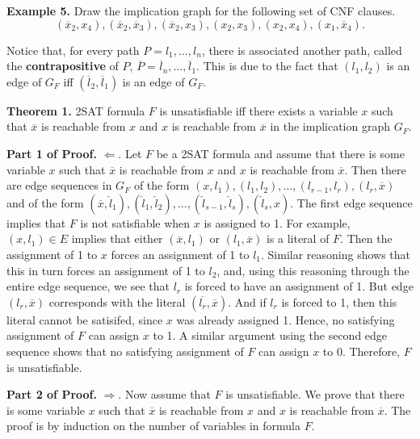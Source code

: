 \documentclass [12pt]{article}
\theoremstyle{definition}
\begin{document}
\newpage
\noindent
{\bf Example 5.} Draw the implication graph for the following set of CNF clauses.
\[
(\overline{x}_{2},x_{4}),
(\overline{x}_{2},\overline{x}_{3}),
(\overline{x}_{2},x_{3}),
(x_{2},x_{3}),
(x_{2},x_{4}),
(x_{1},\overline{x}_{4}).\]



\newpage
Notice that, for every path $P=l_{1},\ldots,l_{n}$, there is associated another path, called the \textbf{contrapositive} of $P$,  $\overline{P}=\overline{l}_{n},\ldots,\overline{l}_{1}$.
This is due to the fact that $(l_{1},l_{2})$ is an edge of $G_{F}$ iff $(\overline{l}_{2},\overline{l}_{1})$ is an edge of $G_{F}$.

\noindent
{\bf Theorem 1.} 2SAT formula $F$ is unsatisfiable iff there exists a variable $x$ such that 
 $\overline{x}$ is reachable from $x$ and $x$ is reachable from $\overline{x}$ in the implication graph
$G_{F}$.

\vspace{.25in}
\noindent
{\bf Part 1 of Proof.} $\Leftarrow$. Let $F$ be a 2SAT formula and 
assume that there is some variable $x$ such that 
 $\overline{x}$ is reachable from $x$ and $x$ is reachable from $\overline{x}$. Then there are 
edge sequences  in 
$G_{F}$ of the form $(x,l_{1}),(l_{1},l_{2}),\ldots,(l_{r-1},l_{r}),(l_{r},\overline{x})$
and of the form 
$(\overline{x},\hat{l}_{1}),(\hat{l}_{1},\hat{l}_{2}),\ldots,(\hat{l}_{s-1},\hat{l}_{s}),(\hat{l}_{s},x)$.
The first edge sequence implies that $F$ is not satisfiable when $x$ is assigned to 1. 
For example, $(x,l_{1})\in E$ implies that either $(\overline{x},l_{1})$ or 
$(l_{1},\overline{x})$ is a literal of $F$. Then the assignment of 1 to $x$ forces an assignment
of 1 to $l_{1}$. Similar reasoning shows that this in turn forces an assignment of 1 to 
$l_{2}$, and, using this reasoning through the entire edge sequence, we see that 
$l_{r}$ is forced to have an assignment of 1. But edge 
$(l_{r},\overline{x})$ corresponds with the literal $(\overline{l_{r}},\overline{x})$. And if 
$l_{r}$ is forced to 1, then this literal cannot be satisifed, since $x$ was already assigned 1. 
Hence, no satisfying assignment of $F$ can assign $x$ to 1. A similar argument using the 
second edge sequence shows that no satisfying assignment of $F$ can assign $x$ to 0. 
Therefore, $F$ is unsatisfiable. 

{\bf Part 2 of Proof.} $\Rightarrow$. Now assume that $F$ is unsatisfiable. We prove that there is
some variable $x$ such that 
 $\overline{x}$ is reachable from $x$ and $x$ is reachable from $\overline{x}$. The proof is by induction
on the number of variables in formula $F$. 
\end{document}
